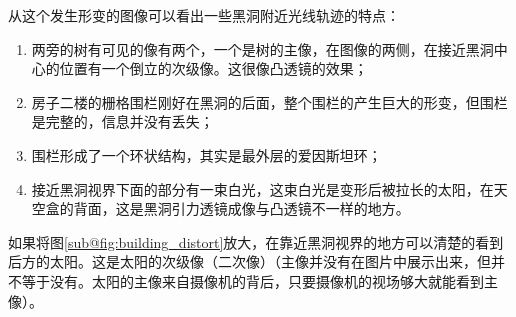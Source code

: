 从这个发生形变的图像可以看出一些黑洞附近光线轨迹的特点：
\begin{enumerate}
    \item 两旁的树有可见的像有两个，一个是树的主像，在图像的两侧，在接近黑洞中心的位置有一个倒立的次级像。这很像凸透镜的效果；
    \item 房子二楼的栅格围栏刚好在黑洞的后面，整个围栏的产生巨大的形变，但围栏是完整的，信息并没有丢失；
    \item 围栏形成了一个环状结构，其实是最外层的爱因斯坦环；
    \item 接近黑洞视界下面的部分有一束白光，这束白光是变形后被拉长的太阳，在天空盒的背面，这是黑洞引力透镜成像与凸透镜不一样的地方。
\end{enumerate}
如果将图\ref{sub@fig:building_distort}放大，在靠近黑洞视界的地方可以清楚的看到后方的太阳。这是太阳的次级像（二次像）（主像并没有在图片中展示出来，但并不等于没有。太阳的主像来自摄像机的背后，只要摄像机的视场够大就能看到主像）。

